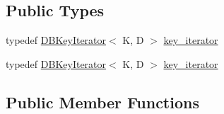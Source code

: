 \subsection*{Public Types}
\begin{DoxyCompactItemize}
\item 
typedef \mbox{\hyperlink{classFILEDB_1_1DBKeyIterator}{D\+B\+Key\+Iterator}}$<$ K, D $>$ \mbox{\hyperlink{classFILEDB_1_1AllConfStoreDB_a2ce8981ca7049ed0c2c6e438873a9c1b}{key\+\_\+iterator}}
\item 
typedef \mbox{\hyperlink{classFILEDB_1_1DBKeyIterator}{D\+B\+Key\+Iterator}}$<$ K, D $>$ \mbox{\hyperlink{classFILEDB_1_1AllConfStoreDB_a2ce8981ca7049ed0c2c6e438873a9c1b}{key\+\_\+iterator}}
\end{DoxyCompactItemize}
\subsection*{Public Member Functions}

